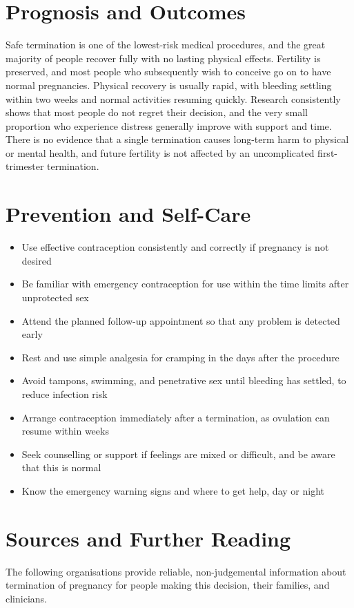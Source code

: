 \section*{Prognosis and Outcomes}
Safe termination is one of the lowest-risk medical procedures, and the great majority of people recover fully with no lasting physical effects. Fertility is preserved, and most people who subsequently wish to conceive go on to have normal pregnancies. Physical recovery is usually rapid, with bleeding settling within two weeks and normal activities resuming quickly. Research consistently shows that most people do not regret their decision, and the very small proportion who experience distress generally improve with support and time. There is no evidence that a single termination causes long-term harm to physical or mental health, and future fertility is not affected by an uncomplicated first-trimester termination.

\section*{Prevention and Self-Care}
\begin{itemize}
    \item Use effective contraception consistently and correctly if pregnancy is not desired
    \item Be familiar with emergency contraception for use within the time limits after unprotected sex
    \item Attend the planned follow-up appointment so that any problem is detected early
    \item Rest and use simple analgesia for cramping in the days after the procedure
    \item Avoid tampons, swimming, and penetrative sex until bleeding has settled, to reduce infection risk
    \item Arrange contraception immediately after a termination, as ovulation can resume within weeks
    \item Seek counselling or support if feelings are mixed or difficult, and be aware that this is normal
    \item Know the emergency warning signs and where to get help, day or night
\end{itemize}

\section*{Sources and Further Reading}
The following organisations provide reliable, non-judgemental information about termination of pregnancy for people making this decision, their families, and clinicians.

